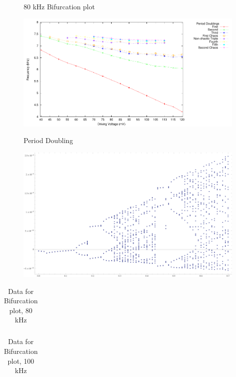 \documentclass[12pt]{report}
\begin{document}
	\begin{figure}[h]
		\centering
		
		\label{fig:80khzBifurcation}
		\caption{80 kHz Bifurcation plot}
	\end{figure}

	\begin{figure}[h]
		\centering
		\includegraphics{plots/general.pdf}
		\label{fig:periodDoubling}
		\caption{Period Doubling}
	\end{figure}

	\begin{figure}[h]
		\centering
		\includegraphics{simulations/circuit.png}
	\end{figure}

	\begin{table}
		\centering
		\begin{tabular}{|l|l|l||l|l|l|}
			\hline
			 
		\end{tabular}
		\label{tab:80khz}
		\caption{Data for Bifurcation plot, 80 kHz}
	\end{table}

	\begin{table}
		\centering
		\begin{tabular}{|l|l|l|l||l|l|l|l|}
			\hline
			 
		\end{tabular}
		\label{tab:100khz}
		\caption{Data for Bifurcation plot, 100 kHz}
	\end{table}
\end{document}

